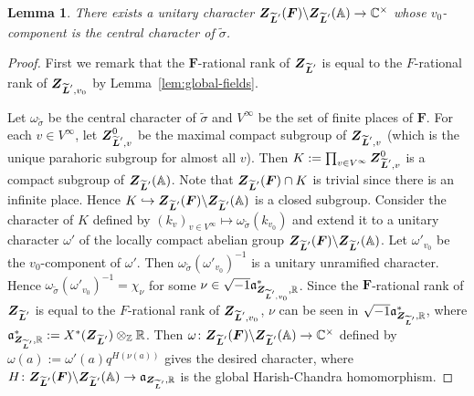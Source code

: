 \documentclass[a4paper]{amsart}
\numberwithin{equation}{section}
\newtheorem{lem}[thm]{Lemma}
\theoremstyle{remark}
\theoremstyle{definition}
\newcommand{\C}{\mathbb{C}}
\newcommand{\Z}{\mathbb{Z}}
\newcommand{\R}{\mathbb{R}}
\newcommand{\glob}[1]{\boldsymbol{#1}}
\newcommand{\lowprime}[1][\prime]{
  \mathchoice
    {\raisebox{-0.7ex}{$\scriptstyle #1$}}
    {\raisebox{-0.7ex}{$\scriptstyle #1$}}
    {\raisebox{-0.7ex}{$\scriptstyle #1$}}
    {\raisebox{-0.3ex}{$\scriptscriptstyle #1$}}
}
\begin{document}
\begin{lem}\label{lem:globalise-char}
There exists a unitary character $\glob{Z}_{\widetilde{\glob{L}}^{\lowprime}}(\glob{F})\backslash \glob{Z}_{\widetilde{\glob{L}}^{\lowprime}}(\mathbb{A})\to \C^{\times}$ whose $v_{0}$-component is the central character of $\widetilde{\sigma}$.
\end{lem}
\begin{proof}
First we remark that the $\glob{F}$-rational rank of $\glob{Z}_{\widetilde{\glob{L}}^{\lowprime}}$ is equal to the $F$-rational rank of $\glob{Z}_{\widetilde{\glob{L}}^{\lowprime},v_{0}}$ by Lemma~\ref{lem:global-fields}. 

Let $\omega_{\widetilde{\sigma}}$ be the central character of $\widetilde{\sigma}$ and $V^{\infty}$ be the set of finite places of $\glob{F}$.
For each $v\in V^{\infty}$, let $\glob{Z}_{\widetilde{\glob{L}}^{\lowprime},v}^{0}$ be the maximal compact subgroup of $\glob{Z}_{\widetilde{\glob{L}}^{\lowprime},v}$ (which is the unique parahoric subgroup for almost all $v$).
Then $K := \prod_{v\in V^{\infty}}\glob{Z}_{\widetilde{\glob{L}}^{\lowprime},v}^{0}$ is a compact subgroup of $\glob{Z}_{\widetilde{\glob{L}}^{\lowprime}}(\mathbb{A})$. Note that $\glob{Z}_{\widetilde{\glob{L}}^{\lowprime}}(\glob{F})\cap K$ is trivial since there is an infinite place.
Hence $K\hookrightarrow \glob{Z}_{\widetilde{\glob{L}}^{\lowprime}}(\glob{F})\backslash \glob{Z}_{\widetilde{\glob{L}}^{\lowprime}}(\mathbb{A})$ is a closed subgroup.
Consider the character of $K$ defined by $(k_{v})_{v\in V^{\infty}}\mapsto \omega_{\widetilde{\sigma}}(k_{v_{0}})$ and extend it to a unitary character $\omega'$ of the locally compact abelian group $\glob{Z}_{\widetilde{\glob{L}}^{\lowprime}}(\glob{F})\backslash \glob{Z}_{\widetilde{\glob{L}}^{\lowprime}}(\mathbb{A})$.
Let $\omega'_{v_{0}}$ be the $v_{0}$-component of $\omega'$.
Then $\omega_{\widetilde{\sigma}}(\omega'_{v_{0}})^{-1}$ is a unitary unramified character.
Hence $\omega_{\widetilde{\sigma}}(\omega'_{v_{0}})^{-1} = \chi_{\nu}$ for some $\nu \in \sqrt{-1}\mathfrak{a}_{\glob{Z}_{\widetilde{\glob{L}}^{\lowprime},v_{0}},\R}^*$.
Since the $\glob{F}$-rational rank of $\glob{Z}_{\widetilde{\glob{L}}^{\lowprime}}$ is equal to the $F$-rational rank of $\glob{Z}_{\widetilde{\glob{L}}^{\lowprime},v_{0}}$, $\nu$ can be seen in $\sqrt{-1}\mathfrak{a}_{\glob{Z}_{\widetilde{\glob{L}}^{\lowprime}},\R}^*$, where $\mathfrak{a}^*_{\glob{Z}_{\widetilde{\glob{L}}^{\lowprime}},\R} := X^{*}(\glob{Z}_{\widetilde{\glob{L}}^{\lowprime}})\otimes_{\Z}\R$.
Then $\omega\colon \glob{Z}_{\widetilde{\glob{L}}^{\lowprime}}(\glob{F})\backslash \glob{Z}_{\widetilde{\glob{L}}^{\lowprime}}(\mathbb{A})\to \C^{\times}$ defined by $\omega(a) := \omega'(a)q^{H(\nu(a))}$ gives the desired character, where $H\colon \glob{Z}_{\widetilde{\glob{L}}^{\lowprime}}(\glob{F})\backslash \glob{Z}_{\widetilde{\glob{L}}^{\lowprime}}(\mathbb{A})\to \mathfrak{a}_{\glob{Z}_{\widetilde{\glob{L}}^{\lowprime}},\R}$ is the global Harish-Chandra homomorphism.
\end{proof}
\end{document}
